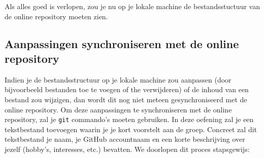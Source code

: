 \documentclass[a4paper]{article}
\begin{document}
Als alles goed is verlopen, zou je nu op je lokale machine de bestandsstuctuur van de online repository moeten zien.


\subsection{Aanpassingen synchroniseren met de online repository}
Indien je de bestandsstructuur op je lokale machine zou aanpassen (door bijvoorbeeld bestanden toe te voegen of the verwijderen) of de inhoud van een bestand zou wijzigen, dan wordt dit nog niet meteen gesynchroniseerd met de online repository.
Om deze aanpassingen te synchroniseren met de online repository, zal je \texttt{git} commando's moeten gebruiken.
In deze oefening zal je een tekstbestand toevoegen waarin je je kort voorstelt aan de groep.
Concreet zal dit tekstbestand je naam, je GitHub accountnaam en een korte beschrijving over jezelf (hobby's, interesses, etc.) bevatten.
We doorlopen dit proces stapsgewijs:
\end{document}
